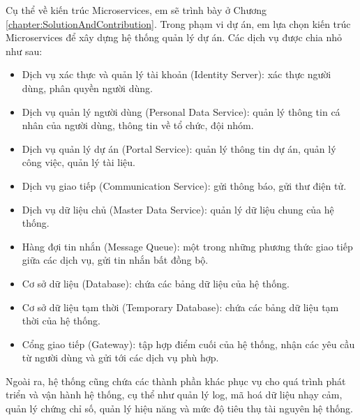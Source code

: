 \documentclass[../DoAn.tex]{subfiles}
\begin{document}
Cụ thể về kiến trúc Microservices, em sẽ trình bày ở Chương \ref{chapter:SolutionAndContribution}. Trong phạm vi dự án, em lựa chọn kiến trúc Microservices để xây dựng hệ thống quản lý dự án. Các dịch vụ được chia nhỏ như sau:
\begin{itemize}
    \item Dịch vụ xác thực và quản lý tài khoản (Identity Server): xác thực người dùng, phân quyền người dùng.
    \item Dịch vụ quản lý người dùng (Personal Data Service): quản lý thông tin cá nhân của người dùng, thông tin về tổ chức, đội nhóm.
    \item Dịch vụ quản lý dự án (Portal Service): quản lý thông tin dự án, quản lý công việc, quản lý tài liệu.
    \item Dịch vụ giao tiếp (Communication Service): gửi thông báo, gửi thư điện tử.
    \item Dịch vụ dữ liệu chủ (Master Data Service): quản lý dữ liệu chung của hệ thống.
    \item Hàng đợi tin nhắn (Message Queue): một trong những phương thức giao tiếp giữa các dịch vụ, gửi tin nhắn bất đồng bộ.
    \item Cơ sở dữ liệu (Database): chứa các bảng dữ liệu của hệ thống.
    \item Cơ sở dữ liệu tạm thời (Temporary Database): chứa các bảng dữ liệu tạm thời của hệ thống.
    \item Cổng giao tiếp (Gateway): tập hợp điểm cuối của hệ thống, nhận các yêu cầu từ người dùng và gửi tới các dịch vụ phù hợp.
\end{itemize}

Ngoài ra, hệ thống cũng chứa các thành phần khác phục vụ cho quá trình phát triển và vận hành hệ thống, cụ thể như quản lý log, mã hoá dữ liệu nhạy cảm, quản lý chứng chỉ số,
quản lý hiệu năng và mức độ tiêu thụ tài nguyên hệ thống.
\end{document}
